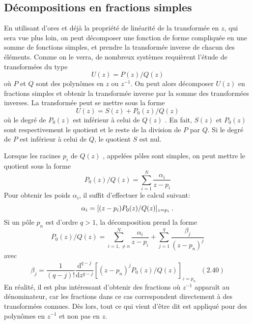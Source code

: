 \subsection{D\'{e}compositions en fractions simples}
En utilisant d'ores et d\'{e}j\`{a} la propri\'{e}t\'{e} de lin\'{e}arit\'{e} de la transform\'{e}e en $z$, qui sera vue plus loin, on peut d\'{e}composer une fonction de forme compliqu\'{e}e en une somme de fonctions simples, et prendre la transform\'{e}e inverse de chacun des \'{e}l\'{e}ments. Comme on le verra, de nombreux syst\`{e}mes requi\`{e}rent l'\'{e}tude de transform\'{e}es du type
\begin{equation}
\label{eq:definition-U}
U(z)=P(z)/Q(z)
\end{equation}
o\`{u} $P$ et $Q$ sont des polyn\^{o}mes en $z$ ou $z^{-1}$. On peut alors d\'{e}composer $U(z)$ en fractions simples et obtenir la transform\'{e}e inverse par la somme des transform\'{e}es inverses. La transform\'{e}e peut se mettre sous la forme
$$
U(z)=S(z)+P_{0}(z)/Q(z)
$$
o\`{u} le degr\'{e} de $P_{0}(z)$ est inf\'{e}rieur \`{a} celui de $Q(z)$ . En fait, $S(z)$ et $P_{0}(z)$ sont respectivement le quotient et le reste de la division de $P$ par $Q$. Si le degr\'{e} de $P$ est inf\'{e}rieur \`{a} celui de $Q$, le quotient $S$ est nul.

Lorsque les racines $p_{i}$ de $Q(z)$ , appel\'{e}es p\^{o}les sont simples, on peut mettre le quotient sous la forme
\begin{equation}
\label{eq:decomposition-pole-simple}
P_{0}(z)/Q(z)=\sum_{i=1}^{N}\frac{\alpha_{i}}{z-p_{i}}
\end{equation}
Pour obtenir les poids $\alpha_{i}$, il suffit d'effectuer le calcul suivant:
$$
\alpha_{i}=[(z-p_{i})P_{0}(z)/Q(z)]_{z=p_{i}} \;.
$$
Si un p\^{o}le $p_{n}$ est d'ordre $q>1$, la d\'{e}composition prend la forme
$$
P_{0}(z)/Q(z)=\sum_{i=1,\neq n}^{N}\frac{\alpha_{i}}{z-p_{i}}+\sum_{j=1}^{q}\frac{\beta_{j}}{(z-p_{n})^{j}}
$$
avec
$$
\beta_{j}=\frac{1}{(q-j)!}\frac{\mathrm{d}^{q-j}}{\mathrm{d}z^{q-j}}[(z-p_{n})^{j}P_{0}(z)/Q(z)]_{z=p_{n}}\text{   }(2.40)
$$
En r\'{e}alit\'{e}, il est plus int\'{e}ressant d'obtenir des fractions o\`{u} $z^{-1}$ apparaît au
d\'{e}nominateur, car les fractions dans ce cas correspondent directement \`{a} des
transform\'{e}es connues. D\`{e}s lors, tout ce qui vient d'\^{e}tre dit est appliqu\'{e} pour
des polyn\^{o}mes en $z^{-1}$ et non pas en $z$.

